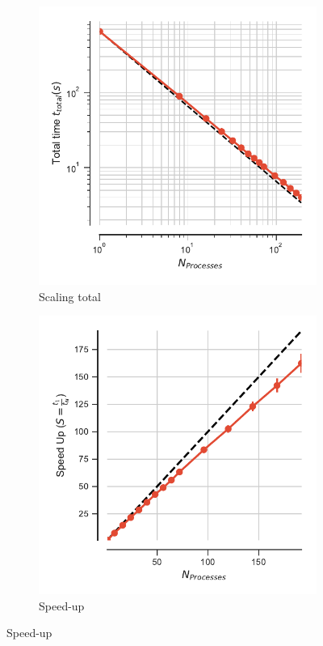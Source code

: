 \begin{figure}
\centering
\begin{subfigure}{.4\textwidth}
  \includegraphics[width=\linewidth]{figures/hdf5-t_total.pdf}
  \caption{Scaling total}
  \label{fig:MPIscaling-hdf5}
\end{subfigure}
\hfill
\begin{subfigure}{.4\textwidth}
  \includegraphics[width=\linewidth]{figures/hdf5-speed_up.pdf}
  \caption{Speed-up}
  \label{fig:MPIspeedup-hdf5}
\end{subfigure}
\bigskip


\end{figure}
